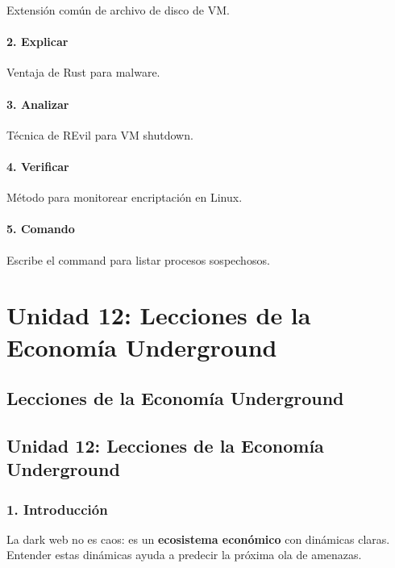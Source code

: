 \documentclass[
  letterpaper,
]{report}
\begin{document}
Extensión común de archivo de disco de VM.

\subsection{2. Explicar}\label{explicar-6}

Ventaja de Rust para malware.

\subsection{3. Analizar}\label{analizar-3}

Técnica de REvil para VM shutdown.

\subsection{4. Verificar}\label{verificar-4}

Método para monitorear encriptación en Linux.

\subsection{5. Comando}\label{comando-9}

Escribe el command para listar procesos sospechosos.

\part{Unidad 12: Lecciones de la Economía Underground}

\chapter{Lecciones de la Economía
Underground}\label{lecciones-de-la-economuxeda-underground}

\chapter{Unidad 12: Lecciones de la Economía
Underground}\label{unidad-12-lecciones-de-la-economuxeda-underground-1}

\section{1. Introducción}\label{introducciuxf3n-11}

La dark web no es caos: es un \textbf{ecosistema económico} con
dinámicas claras. Entender estas dinámicas ayuda a predecir la próxima
ola de amenazas.
\end{document}
